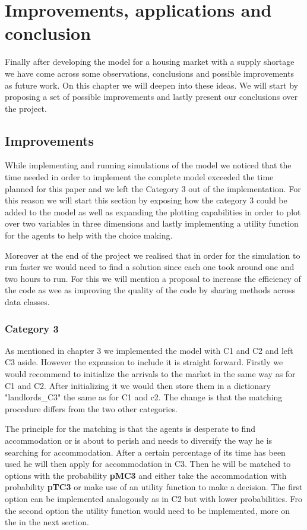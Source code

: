 \chapter{Improvements, applications and conclusion}

Finally after developing the model for a housing market with a supply shortage we have come across some observations, conclusions and possible improvements as future work. On this chapter we will deepen into these ideas. We will start by proposing a set of possible improvements and lastly present our conclusions over the project.

\section{Improvements}

While implementing and running simulations of the model we noticed that the time needed in order to implement the complete model exceeded the time planned for this paper and we left the Category 3 out of the implementation. For this reason we will start this section by exposing how the category 3 could be added to the model as well as expanding the plotting capabilities in order to plot over two variables in three dimensions and lastly implementing a utility function for the agents to help with the choice making.

Moreover at the end of the project we realised that in order for the simulation to run faster we would need to find a solution since each one took around  one and two hours to run. For this we will mention a proposal to increase the efficiency of the code as wee as improving the quality of the code by sharing methods across data classes.

\subsection{Category 3}

As mentioned in chapter 3 we implemented the model with C1 and C2 and left C3 aside. However the expansion to include it is straight forward. Firstly we would recommend to initialize the arrivals to the market in the same way as for C1 and C2. After initializing it we would then store them in a dictionary "landlords\_C3" the same as for C1 and c2. The change is that the matching procedure differs from the two other categories. 

The principle for the matching is that the agents is desperate to find accommodation or is about to perish and needs to diversify the way he is searching for accommodation. After a certain percentage of its time has been used he will then apply for accommodation in C3. Then he will be matched to options with the probability \textbf{pMC3} and either take the accommodation with probability \textbf{pTC3} or make use of an utility function to make a decision. The first option can be implemented analogously as in C2 but with lower probabilities. Fro the second option the utility function would need to be implemented, more on the in the next section.

